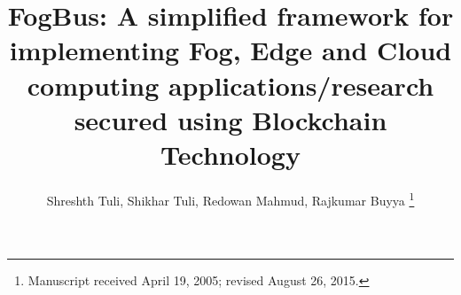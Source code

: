 \documentclass[10pt,journal,compsoc]{IEEEtran}
\begin{document}
%
\title{FogBus: A simplified framework for implementing Fog, Edge and Cloud computing applications/research secured using Blockchain Technology}
%
%
%
%

\author{Shreshth Tuli, Shikhar Tuli, Redowan Mahmud, Rajkumar Buyya%
\thanks{Manuscript received April 19, 2005; revised August 26, 2015.}}
\end{document}
